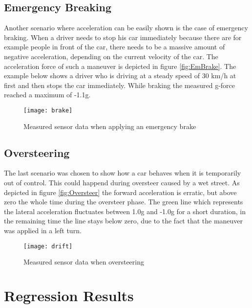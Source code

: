 \subsection{Emergency Breaking}
Another scenario where acceleration can be easily shown is the case of emergency braking. When a driver needs to stop his car immediately because there are for example people in front of the car, there needs to be a massive amount of negative acceleration, depending on the current velocity of the car. The acceleration force of such a maneuver is depicted in figure \vref{fig:EmBrake}. The example below shows a driver who is driving at a steady speed of 30 km/h at first and then stops the car immediately. While braking the measured g-force reached a maximum of -1.1g.


\begin{figure}[H]
    \centering
    \texttt{[image: brake]}
    \caption{Measured sensor data when applying an emergency brake}
    \label{fig:EmBrake}
\end{figure}

\subsection{Oversteering}

The last scenario was chosen to show how a car behaves when it is temporarily out of control. This could happend during oversteer caused by a wet street. As depicted in figure \vref{fig:Oversteer} the forward acceleration is erratic, but above zero the whole time during the oversteer phase. The green line which represents the lateral acceleration fluctuates between 1.0g and -1.0g for a short duration, in the remaining time the line stays below zero, due to the fact that the maneuver was applied in a left turn.

\begin{figure}[H]
    \centering
    \texttt{[image: drift]}
    \caption{Measured sensor data when oversteering}
    \label{fig:Oversteer}
\end{figure}

\section{Regression Results}


